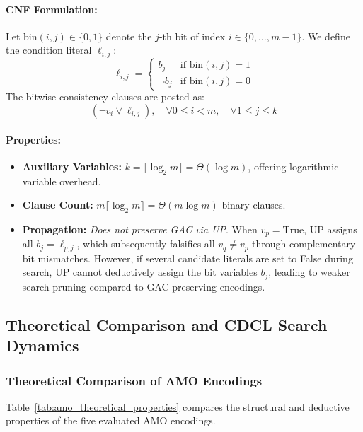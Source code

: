\documentclass[a4paper,fleqn]{cas-sc}
\begin{document}
\paragraph{CNF Formulation:}
Let $\text{bin}(i, j) \in \{0, 1\}$ denote the $j$-th bit of index $i \in \{0, \dots, m-1\}$. We define the condition literal $\ell_{i, j}$:
\begin{equation}
    \ell_{i, j} = \begin{cases} b_j & \text{if } \text{bin}(i, j) = 1 \\ \neg b_j & \text{if } \text{bin}(i, j) = 0 \end{cases}
\end{equation}
The bitwise consistency clauses are posted as:
\begin{equation}
    (\neg v_i \vee \ell_{i, j}), \quad \forall 0 \le i < m, \quad \forall 1 \le j \le k \label{eq:binary_clause}
\end{equation}
\paragraph{Properties:}
\begin{itemize}
    \item \textbf{Auxiliary Variables:} $k = \lceil \log_2 m \rceil = \Theta(\log m)$, offering logarithmic variable overhead.
    \item \textbf{Clause Count:} $m \lceil \log_2 m \rceil = \Theta(m \log m)$ binary clauses.
    \item \textbf{Propagation:} \textit{Does not preserve GAC via UP}. When $v_p = \text{True}$, UP assigns all $b_j = \ell_{p, j}$, which subsequently falsifies all $v_q \ne v_p$ through complementary bit mismatches. However, if several candidate literals are set to False during search, UP cannot deductively assign the bit variables $b_j$, leading to weaker search pruning compared to GAC-preserving encodings.
\end{itemize}

\subsection{Theoretical Comparison and CDCL Search Dynamics}
\label{subsec:sat_cdcl_mechanics}

\subsubsection{Theoretical Comparison of AMO Encodings}
Table~\ref{tab:amo_theoretical_properties} compares the structural and deductive properties of the five evaluated AMO encodings.
\end{document}
